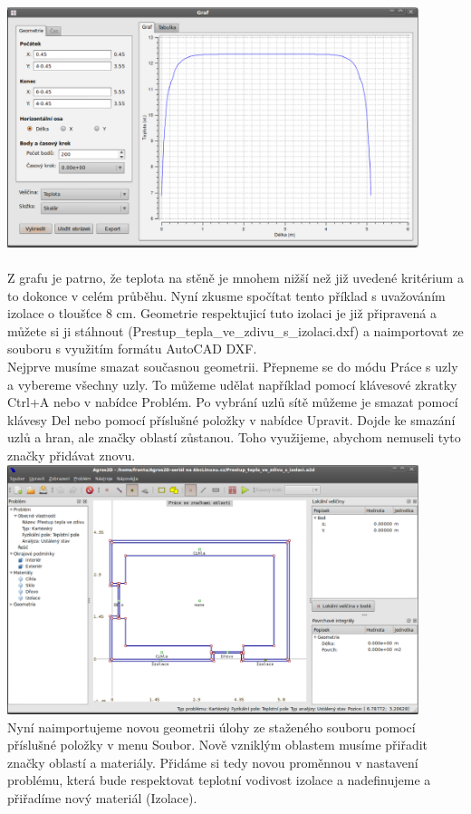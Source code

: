 \documentclass[a4paper, oneside]{article}
\begin{document}
\includegraphics[width=12cm]{Vytvareni_grafu.eps}\\
\\
Z grafu je patrno, že teplota na stěně je mnohem nižší než již uvedené kritérium a to dokonce v celém průběhu. Nyní zkusme spočítat tento příklad s uvažováním izolace o tloušťce 8 cm. Geometrie respektujicí tuto izolaci je již připravená a můžete si ji stáhnout (Prestup\_tepla\_ve\_zdivu\_s\_izolaci.dxf) a naimportovat ze souboru s využitím formátu AutoCAD DXF.\\
Nejprve musíme smazat současnou geometrii. Přepneme se do módu Práce s uzly a vybereme všechny uzly. To můžeme udělat například pomocí klávesové zkratky Ctrl+A nebo v nabídce Problém. Po vybrání uzlů sítě můžeme je smazat pomocí klávesy Del nebo pomocí příslušné položky v nabídce Upravit. Dojde ke smazání uzlů a hran, ale značky oblastí zůstanou. Toho využijeme, abychom nemuseli tyto značky přidávat znovu.\\
\includegraphics[width=12cm]{Geometrie_izolace.eps}\\
Nyní naimportujeme novou geometrii úlohy ze staženého souboru pomocí příslušné položky v menu Soubor. Nově vzniklým oblastem musíme přiřadit značky oblastí a materiály. Přidáme si tedy novou proměnnou v nastavení problému, která bude respektovat teplotní vodivost izolace a nadefinujeme a přiřadíme nový materiál (Izolace).\\
\end{document}
